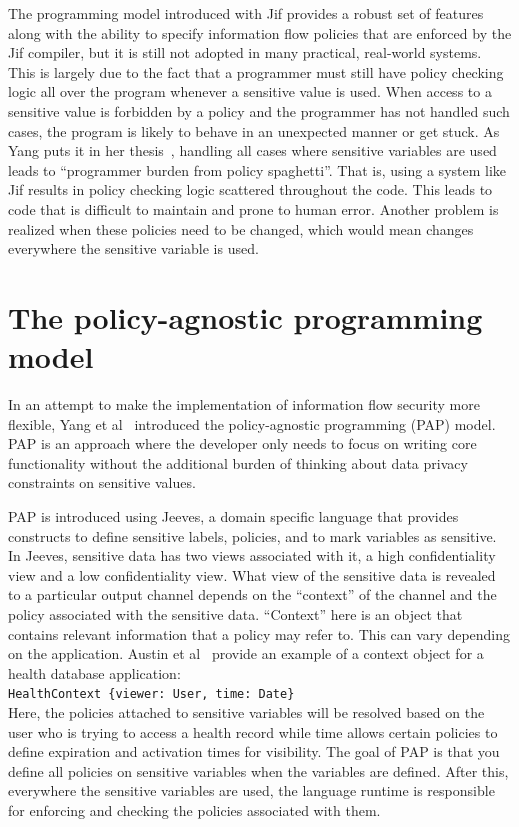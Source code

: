 The programming model introduced with Jif provides a robust set of features along
with the ability to specify information flow policies that are enforced by the Jif
compiler, but it is still not adopted in many practical, real-world systems. This
is largely due to the fact that a programmer must still have policy checking logic
all over the program whenever a sensitive value is used. When access to a sensitive
value is forbidden by a policy and the programmer has not handled such cases, the
program is likely to behave in an unexpected manner or get stuck. As Yang puts it
in her thesis~\cite{YangPhd}, handling all cases where sensitive variables are used
leads to ``programmer burden from policy spaghetti''. That is, using a system like
Jif results in policy checking logic scattered throughout the code. This leads to
code that is difficult to maintain and prone to human error. Another problem is
realized when these policies need to be changed, which would mean changes everywhere
the sensitive variable is used.

\section{The policy-agnostic programming model}
In an attempt to make the implementation of information flow security more flexible,
Yang et al~\cite{Jeeves} introduced the policy-agnostic programming (PAP) model.
PAP is an approach where the developer only needs to focus on writing core functionality
without the additional burden of thinking about data privacy constraints on sensitive
values.

PAP is introduced using Jeeves, a domain specific language that provides constructs
to define sensitive labels, policies, and to mark variables as sensitive. In
Jeeves, sensitive data has two views associated with it, a high confidentiality
view and a low confidentiality view. What view of the sensitive data is revealed
to a particular output channel depends on the ``context'' of the channel and the
policy associated with the sensitive data. ``Context'' here is an object that contains
relevant information that a policy may refer to. This can vary depending on the
application. Austin et al~\cite{FacetedJeeves} provide an example of a context
object for a health database application:\\
\indent \indent \texttt{HealthContext \{viewer: User, time: Date\}}\\
Here, the policies attached to sensitive variables will be resolved based on the
user who is trying to access a health record while time allows certain policies
to define expiration and activation times for visibility.
The goal of PAP is that you define all policies on sensitive variables when the
variables are defined. After this, everywhere the sensitive variables are used,
the language runtime is responsible for enforcing and checking the policies
associated with them.

